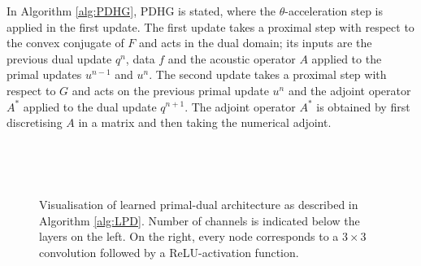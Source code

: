 \documentclass[journal]{IEEEtran}
\begin{document}
In Algorithm \ref{alg:PDHG}, PDHG is stated, where the $\theta$-acceleration step is applied in the first update. The first update takes a proximal step with respect to the convex conjugate of $F$ and acts in the dual domain; its inputs are the previous dual update $q^n$, data $f$ and the acoustic operator $A$ applied to the primal updates $u^{n-1}$ and $u^n$. The second update takes a proximal step with respect to $G$ and acts on the previous primal update $u^n$ and the adjoint operator $A^*$ applied to the dual update $q^{n+1}$. {The adjoint operator $A^*$ is obtained by first discretising $A$ in a matrix and then taking the numerical adjoint.}

\vspace{3mm}
\\
\begin{minipage}{\linewidth}
$~$\vspace{-1mm} {}
\end{minipage}

\begin{figure}
\resizebox{1.025\linewidth}{!}{%
\begin{tikzpicture}

\end{tikzpicture}}
\caption{Visualisation of learned primal-dual architecture as described in Algorithm \ref{alg:LPD}. Number of channels is indicated below the layers on the left. On the right, every node corresponds to a $3\times3$ convolution followed by a ReLU-activation function.}
\label{fig:recon_segm_setup}
\vspace{-2.5mm}
\end{figure}
\end{document}
